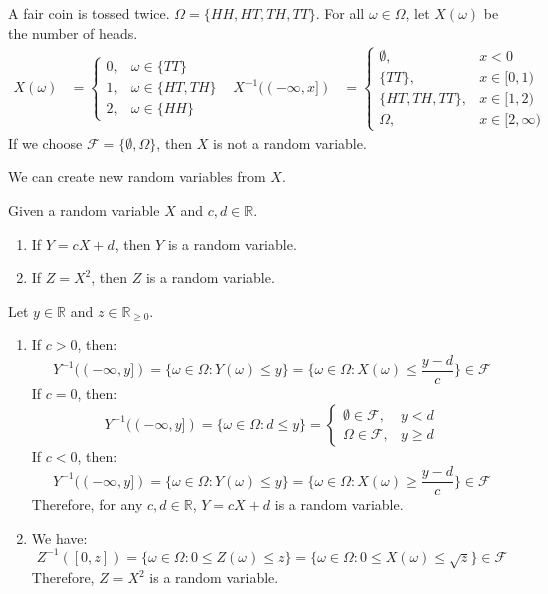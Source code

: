 \documentclass{huhtakm-template-book}
\begin{document}
\newpage
\begin{eg}
	\label{Chapter 3 (Example) Toss coin twice}
	A fair coin is tossed twice. $\Omega=\{HH,HT,TH,TT\}$. For all $\omega\in\Omega$, let $X(\omega)$ be the number of heads.
	\begin{align*}
		X(\omega)&=\begin{cases}
			0, &\omega\in\{TT\}\\
			1, &\omega\in\{HT,TH\}\\
			2, &\omega\in\{HH\}
		\end{cases} & X^{-1}((-\infty,x])&=\begin{cases}
			\emptyset, & x<0\\
			\{TT\}, & x\in[0,1)\\
			\{HT,TH,TT\}, & x\in[1,2)\\
			\Omega, &x\in[2,\infty)
		\end{cases}
	\end{align*}
	If we choose $\mathcal{F}=\{\emptyset,\Omega\}$, then $X$ is not a random variable.
\end{eg}
We can create new random variables from $X$.
\begin{lem}
	Given a random variable $X$ and $c,d\in\mathbb{R}$.
	\begin{enumerate}
		\item If $Y=cX+d$, then $Y$ is a random variable.
		\item If $Z=X^{2}$, then $Z$ is a random variable.
	\end{enumerate}
\end{lem} 
\begin{proofing}
	Let $y\in\mathbb{R}$ and $z\in\mathbb{R}_{\geq 0}$.
	\begin{enumerate}
		\item If $c>0$, then:
		\begin{equation*}
			Y^{-1}((-\infty,y])=\{\omega\in\Omega:Y(\omega)\leq y\}=\bigg\{\omega\in\Omega:X(\omega)\leq\frac{y-d}{c}\bigg\}\in\mathcal{F}
		\end{equation*}
		If $c=0$, then:
		\begin{equation*}
			Y^{-1}((-\infty,y])=\{\omega\in\Omega:d\leq y\}=\begin{cases}
				\emptyset\in\mathcal{F}, &y<d\\
				\Omega\in\mathcal{F}, &y\geq d
			\end{cases}
		\end{equation*}
		If $c<0$, then:
		\begin{equation*}
			Y^{-1}((-\infty,y])=\{\omega\in\Omega:Y(\omega)\leq y\}=\bigg\{\omega\in\Omega:X(\omega)\geq\frac{y-d}{c}\bigg\}\in\mathcal{F}
		\end{equation*}
		Therefore, for any $c,d\in\mathbb{R}$, $Y=cX+d$ is a random variable.
		\item We have:
		\begin{equation*}
			Z^{-1}([0,z])=\{\omega\in\Omega:0\leq Z(\omega)\leq z\}=\{\omega\in\Omega:0\leq X(\omega)\leq\sqrt{z}\}\in\mathcal{F}
		\end{equation*}
		Therefore, $Z=X^{2}$ is a random variable.
	\end{enumerate}
\end{proofing}
\end{document}
